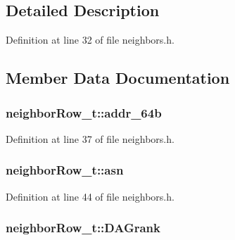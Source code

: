 \subsection{Detailed Description}


Definition at line 32 of file neighbors.\+h.



\subsection{Member Data Documentation}
\subsubsection[{\texorpdfstring{addr\+\_\+64b}{addr_64b}}]{ neighbor\+Row\+\_\+t\+::addr\+\_\+64b}\hypertarget{structneighbor_row__t_ad1f8fd4f98531eb454c37204e7a03f66}{}\label{structneighbor_row__t_ad1f8fd4f98531eb454c37204e7a03f66}


Definition at line 37 of file neighbors.\+h.

\subsubsection[{\texorpdfstring{asn}{asn}}]{ neighbor\+Row\+\_\+t\+::asn}\hypertarget{structneighbor_row__t_af7a02d223c38539667aead0fe666907b}{}\label{structneighbor_row__t_af7a02d223c38539667aead0fe666907b}


Definition at line 44 of file neighbors.\+h.

\subsubsection[{\texorpdfstring{D\+A\+Grank}{DAGrank}}]{ neighbor\+Row\+\_\+t\+::\+D\+A\+Grank}\hypertarget{structneighbor_row__t_a1678b7967801f6e5f3d8822d744fba55}{}\label{structneighbor_row__t_a1678b7967801f6e5f3d8822d744fba55}


